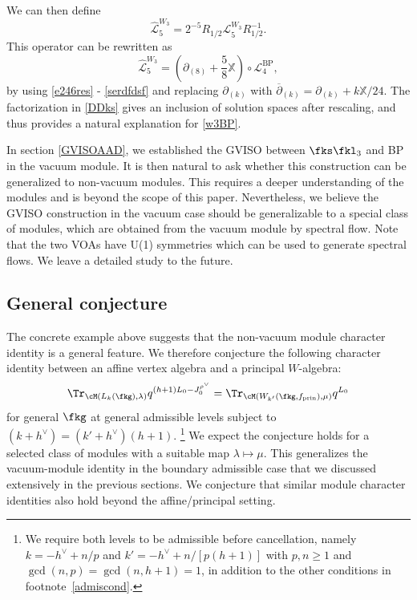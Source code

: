 \documentclass[a4paper,11pt]{article}
\theoremstyle{definition}
\theoremstyle{definition}
\theoremstyle{remark}
\newcommand{\prin}{ \text{prin}}
\newcommand{\be}{\begin{equation}}
\newcommand{\ee}{\end{equation}}
\begin{document}
We can then define  
\be
\widehat {\mathscr L}^{W_3}_5 
=
2^{-5}R_{1/2}\mathscr L^{W_3}_5 R_{1/2}^{-1}.
\ee
This operator can be rewritten as
 \be\label{DDks}
\widehat{\mathscr L}^{W_3}_5
=\left(\partial_{(8)}+\frac58\mathbb{X}\right)\circ\mathscr L_4^{\mathrm{BP}},
\ee 
by using \eqref{e246res} -  \eqref{serdfdsf} and replacing $\partial_{(k)}$ with
$\overline\partial_{(k)}=\partial_{(k)}+k\mathbb{X}/24$. 
The factorization in \eqref{DDks}   gives  an inclusion of solution
spaces after rescaling, and  thus provides a natural  explanation  for   \eqref{w3BP}.
 
  In section \ref{GVISOAAD}, we established the GVISO between $\fks\fkl_3$ and BP in the vacuum module.  
It is then natural to ask whether this construction can be generalized to non-vacuum modules.
This requires a deeper understanding of the modules and is beyond the scope of this paper.   Nevertheless, we believe the GVISO construction in the vacuum case should be generalizable to  a special class of modules, which are obtained from the vacuum module by spectral flow.  Note that the two VOAs have   U(1) symmetries which can be used to generate spectral flows. We leave a detailed study to the future. 
  
\subsection{General conjecture}

The concrete example above suggests that the non-vacuum module character identity is a general feature. We therefore conjecture the following character identity between  an affine vertex algebra and a principal  $W$-algebra:
\be\label{VMgsfsdf}
\Tr_{\cM (L_k(\fkg),\lambda)}q^{(h+1)L_0- J_0^{\rho^\vee}}=\Tr_{\cM (W_{k'}(\fkg,f_\prin),\mu)}q^{  L_0 }
\ee
  for general $\fkg$ at general admissible levels  subject to $(k+h^\vee) =(k'+h^\vee) (h+1)$. 
  \footnote{We   require both  
levels to be admissible before cancellation, namely 
$k=-h^\vee+n/p$ and $k'=-h^\vee+n/[p(h+1)]$ with
$p,n\geq1$ and $\gcd(n,p)=\gcd(n,h+1)=1$, in addition to the other conditions in footnote~\ref{admiscond}.} 
We expect the conjecture holds for a  selected class  of modules with a suitable map $\lambda\mapsto\mu$. This generalizes the vacuum-module identity in the boundary admissible case that we discussed extensively in the previous sections. 
We conjecture that similar module character identities  also hold beyond the affine/principal setting. 
 
 
\end{document}

